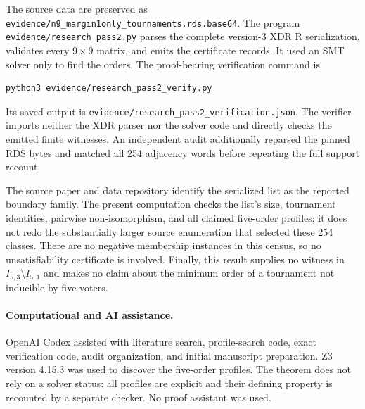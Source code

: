 \documentclass[11pt]{article}
\begin{document}
The source data are preserved as
\texttt{evidence/n9\_margin1only\_tournaments.rds.base64}.  The program
\texttt{evidence/research\_pass2.py} parses the complete version-3 XDR R
serialization, validates every $9\times9$ matrix, and emits the certificate
records.  It used an SMT solver only to find the orders.  The proof-bearing
verification command is
\begin{verbatim}
python3 evidence/research_pass2_verify.py
\end{verbatim}
Its saved output is
\texttt{evidence/research\_pass2\_verification.json}.  The verifier imports
neither the XDR parser nor the solver code and directly checks the emitted
finite witnesses.  An independent audit additionally reparsed the pinned RDS
bytes and matched all 254 adjacency words before repeating the full support
recount.

The source paper and data repository identify the serialized list as the
reported boundary family.  The present computation checks the list's size,
tournament identities, pairwise non-isomorphism, and all claimed five-order
profiles; it does not redo the substantially larger source enumeration that
selected these 254 classes.  There are no negative membership instances in
this census, so no unsatisfiability certificate is involved.  Finally, this
result supplies no witness in $I_{5,3}\setminus I_{5,1}$ and makes no claim
about the minimum order of a tournament not inducible by five voters.

\paragraph{Computational and AI assistance.}
OpenAI Codex assisted with literature search, profile-search code, exact
verification code, audit organization, and initial manuscript preparation.
Z3 version 4.15.3 was used to discover the five-order profiles.  The theorem
does not rely on a solver status: all profiles are explicit and their defining
property is recounted by a separate checker.  No proof assistant was used.



\end{document}
